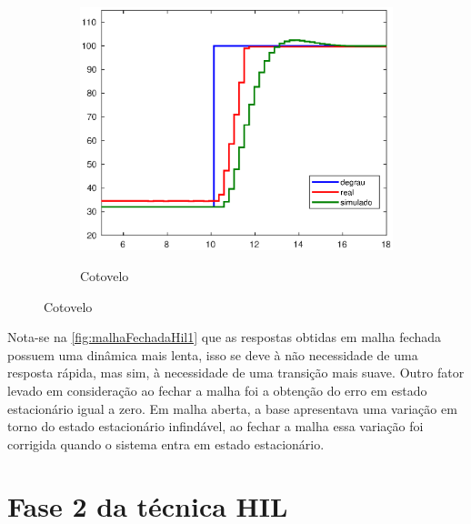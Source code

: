 \begin{figure}[h!]\ContinuedFloat
  \begin{subfigure}{\textwidth}
    \centering
    \caption{Cotovelo}
    \includegraphics[width = 0.55\columnwidth]{Imagens/forearm_mf_simul}
    \label{fig:forearm_mf_simul}
  \end{subfigure}%

\end{figure}


Nota-se na \autoref{fig:malhaFechadaHil1} que as respostas obtidas em malha fechada possuem uma dinâmica mais lenta,
isso se deve à não necessidade de uma resposta rápida, mas sim, à necessidade de uma transição mais suave. Outro fator
levado em consideração ao fechar a malha foi a obtenção do erro em estado estacionário igual a zero. Em malha aberta, a base 
apresentava uma variação em torno do estado estacionário infindável, ao fechar a malha essa variação foi corrigida quando o
sistema entra em estado estacionário.

\section{Fase 2 da técnica HIL}

